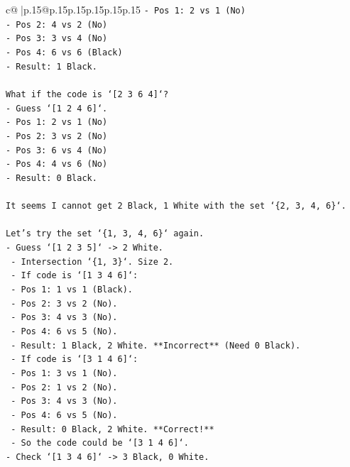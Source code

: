 \documentclass{article}
\begin{document}
{\begin{supertabular}{c@{$\;$}|p{.15\linewidth}@{}p{.15\linewidth}p{.15\linewidth}p{.15\linewidth}p{.15\linewidth}p{.15\linewidth}}
{{{\texttt{{-} Pos 1: 2 vs 1 (No)} \\
\texttt{{-} Pos 2: 4 vs 2 (No)} \\
\texttt{{-} Pos 3: 3 vs 4 (No)} \\
\texttt{{-} Pos 4: 6 vs 6 (Black)} \\
\texttt{{-} Result: 1 Black.} \\
\\ 
\texttt{What if the code is `{[}2 3 6 4{]}`?} \\
\texttt{{-} Guess `{[}1 2 4 6{]}`.} \\
\texttt{{-} Pos 1: 2 vs 1 (No)} \\
\texttt{{-} Pos 2: 3 vs 2 (No)} \\
\texttt{{-} Pos 3: 6 vs 4 (No)} \\
\texttt{{-} Pos 4: 4 vs 6 (No)} \\
\texttt{{-} Result: 0 Black.} \\
\\ 
\texttt{It seems I cannot get 2 Black, 1 White with the set `\{2, 3, 4, 6\}`.} \\
\\ 
\texttt{Let's try the set `\{1, 3, 4, 6\}` again.} \\
\texttt{{-} Guess `{[}1 2 3 5{]}` {-}> 2 White.} \\
\texttt{  {-} Intersection `\{1, 3\}`. Size 2.} \\
\texttt{  {-} If code is `{[}1 3 4 6{]}`:} \\
\texttt{    {-} Pos 1: 1 vs 1 (Black).} \\
\texttt{    {-} Pos 2: 3 vs 2 (No).} \\
\texttt{    {-} Pos 3: 4 vs 3 (No).} \\
\texttt{    {-} Pos 4: 6 vs 5 (No).} \\
\texttt{    {-} Result: 1 Black, 2 White. **Incorrect** (Need 0 Black).} \\
\texttt{  {-} If code is `{[}3 1 4 6{]}`:} \\
\texttt{    {-} Pos 1: 3 vs 1 (No).} \\
\texttt{    {-} Pos 2: 1 vs 2 (No).} \\
\texttt{    {-} Pos 3: 4 vs 3 (No).} \\
\texttt{    {-} Pos 4: 6 vs 5 (No).} \\
\texttt{    {-} Result: 0 Black, 2 White. **Correct!**} \\
\texttt{  {-} So the code could be `{[}3 1 4 6{]}`.} \\
\texttt{{-} Check `{[}1 3 4 6{]}` {-}> 3 Black, 0 White.} \\
}}}
\end{supertabular}}
\end{document}
